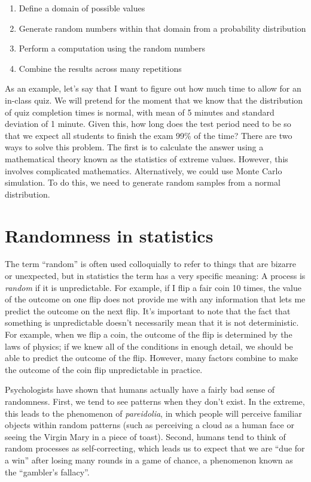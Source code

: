 \documentclass[12pt,]{book}
\providecommand{\tightlist}{%
  \setlength{\itemsep}{0pt}\setlength{\parskip}{0pt}}
\theoremstyle{definition}
\theoremstyle{definition}
\theoremstyle{definition}
\theoremstyle{remark}
\begin{document}
\begin{enumerate}
\def\labelenumi{\arabic{enumi}.}
\tightlist
\item
  Define a domain of possible values
\item
  Generate random numbers within that domain from a probability distribution
\item
  Perform a computation using the random numbers
\item
  Combine the results across many repetitions
\end{enumerate}

As an example, let's say that I want to figure out how much time to allow for an in-class quiz. We will pretend for the moment that we know that the distribution of quiz completion times is normal, with mean of 5 minutes and standard deviation of 1 minute. Given this, how long does the test period need to be so that we expect all students to finish the exam 99\% of the time? There are two ways to solve this problem. The first is to calculate the answer using a mathematical theory known as the statistics of extreme values. However, this involves complicated mathematics. Alternatively, we could use Monte Carlo simulation. To do this, we need to generate random samples from a normal distribution.

\hypertarget{randomness-in-statistics}{%
\section{Randomness in statistics}\label{randomness-in-statistics}}

The term ``random'' is often used colloquially to refer to things that are bizarre or unexpected, but in statistics the term has a very specific meaning: A process is \emph{random} if it is unpredictable. For example, if I flip a fair coin 10 times, the value of the outcome on one flip does not provide me with any information that lets me predict the outcome on the next flip. It's important to note that the fact that something is unpredictable doesn't necessarily mean that it is not deterministic. For example, when we flip a coin, the outcome of the flip is determined by the laws of physics; if we knew all of the conditions in enough detail, we should be able to predict the outcome of the flip. However, many factors combine to make the outcome of the coin flip unpredictable in practice.

Psychologists have shown that humans actually have a fairly bad sense of randomness. First, we tend to see patterns when they don't exist. In the extreme, this leads to the phenomenon of \emph{pareidolia}, in which people will perceive familiar objects within random patterns (such as perceiving a cloud as a human face or seeing the Virgin Mary in a piece of toast). Second, humans tend to think of random processes as self-correcting, which leads us to expect that we are ``due for a win'' after losing many rounds in a game of chance, a phenomenon known as the ``gambler's fallacy''.
\end{document}

